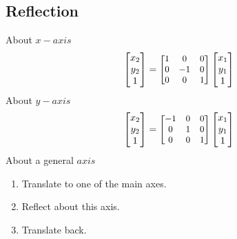 \subsection{Reflection}
About $x-axis$
\[\begin{bmatrix}
  x_2\\
  y_2\\
  1
\end{bmatrix}=
{\small
\begin{bmatrix}
  1 & 0 & 0\\
  0 & -1 & 0\\
  0 & 0 & 1
\end{bmatrix}
}
\begin{bmatrix}
  x_1\\
  y_1\\
  1
\end{bmatrix}
\]
About $y-axis$
\[\begin{bmatrix}
  x_2\\
  y_2\\
  1
\end{bmatrix}=
{\small\begin{bmatrix}
  -1 & 0 & 0\\
  0 & 1 & 0\\
  0 & 0 & 1
\end{bmatrix}
}
\begin{bmatrix}
  x_1\\
  y_1\\
  1
\end{bmatrix}
\]
About a general $axis$
\begin{enumerate}
  \item Translate to one of the main axes.
  \item Reflect about this axis.
  \item Translate back.
\end{enumerate}
